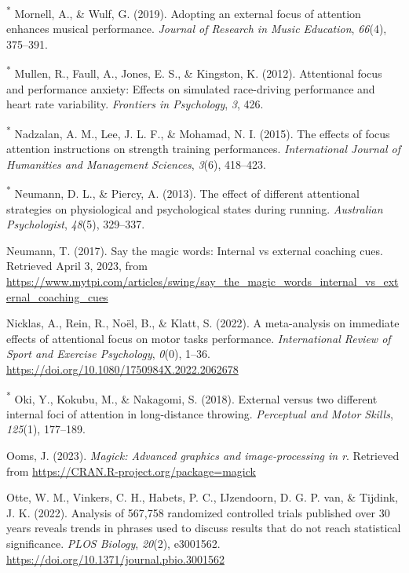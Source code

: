 \documentclass[
  man, donotrepeattitle,floatsintext]{apa7}
\newlength{\cslhangindent}
\newlength{\cslentryspacingunit} %
\newenvironment{CSLReferences}[2] %
 {%
  \setlength{\parindent}{0pt}
  \ifodd #1
  \let\oldpar\par
  \def\par{\hangindent=\cslhangindent\oldpar}
  \fi
  \setlength{\parskip}{#2\cslentryspacingunit}
 }%
 {}
\begin{document}
\begin{CSLReferences}{1}{0}
\leavevmode{}%
\textsuperscript{*} Mornell, A., \& Wulf, G. (2019). Adopting an external focus of attention enhances musical performance. \emph{Journal of Research in Music Education}, \emph{66}(4), 375--391.

\leavevmode{}%
\textsuperscript{*} Mullen, R., Faull, A., Jones, E. S., \& Kingston, K. (2012). Attentional focus and performance anxiety: Effects on simulated race-driving performance and heart rate variability. \emph{Frontiers in Psychology}, \emph{3}, 426.

\leavevmode{}%
\textsuperscript{*} Nadzalan, A. M., Lee, J. L. F., \& Mohamad, N. I. (2015). The effects of focus attention instructions on strength training performances. \emph{International Journal of Humanities and Management Sciences}, \emph{3}(6), 418--423.

\leavevmode{}%
\textsuperscript{*} Neumann, D. L., \& Piercy, A. (2013). The effect of different attentional strategies on physiological and psychological states during running. \emph{Australian Psychologist}, \emph{48}(5), 329--337.

\leavevmode{}%
Neumann, T. (2017). Say the magic words: {Internal} vs external coaching cues. Retrieved April 3, 2023, from \url{https://www.mytpi.com/articles/swing/say_the_magic_words_internal_vs_external_coaching_cues}

\leavevmode{}%
Nicklas, A., Rein, R., Noël, B., \& Klatt, S. (2022). A meta-analysis on immediate effects of attentional focus on motor tasks performance. \emph{International Review of Sport and Exercise Psychology}, \emph{0}(0), 1--36. \url{https://doi.org/10.1080/1750984X.2022.2062678}

\leavevmode{}%
\textsuperscript{*} Oki, Y., Kokubu, M., \& Nakagomi, S. (2018). External versus two different internal foci of attention in long-distance throwing. \emph{Perceptual and Motor Skills}, \emph{125}(1), 177--189.

\leavevmode{}%
Ooms, J. (2023). \emph{Magick: Advanced graphics and image-processing in r}. Retrieved from \url{https://CRAN.R-project.org/package=magick}

\leavevmode{}%
Otte, W. M., Vinkers, C. H., Habets, P. C., IJzendoorn, D. G. P. van, \& Tijdink, J. K. (2022). Analysis of 567,758 randomized controlled trials published over 30 years reveals trends in phrases used to discuss results that do not reach statistical significance. \emph{PLOS Biology}, \emph{20}(2), e3001562. \url{https://doi.org/10.1371/journal.pbio.3001562}


\end{CSLReferences}
\end{document}
